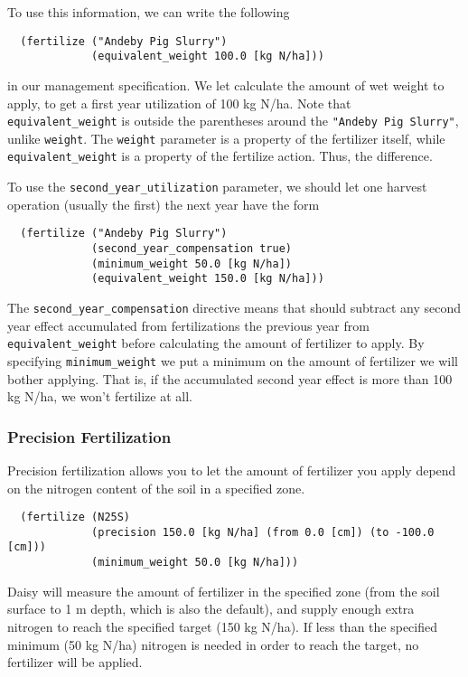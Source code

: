 \documentclass[a4paper,11pt]{article}
\begin{document}
To use this information, we can write the following
\begin{verbatim}
  (fertilize ("Andeby Pig Slurry")
             (equivalent_weight 100.0 [kg N/ha]))
\end{verbatim}
in our management specification.  We let \daisy{} calculate the amount
of wet weight to apply, to get a first year utilization of 100 kg
N/ha.  Note that \texttt{equivalent\_weight} is outside the
parentheses around the \texttt{"Andeby Pig Slurry"}, unlike
\texttt{weight}.  The \texttt{weight} parameter is a property of the
fertilizer itself, while \texttt{equivalent\_weight} is a property of
the fertilize action.  Thus, the difference.

To use the \texttt{second\_year\_utilization} parameter, we should let
one harvest operation (usually the first) the next year have the form
\begin{verbatim}
  (fertilize ("Andeby Pig Slurry")
             (second_year_compensation true)
             (minimum_weight 50.0 [kg N/ha])
             (equivalent_weight 150.0 [kg N/ha]))
\end{verbatim}
The \texttt{second\_year\_compensation} directive means that \daisy{}
should subtract any second year effect accumulated from fertilizations
the previous year from \texttt{equivalent\_weight} before calculating
the amount of fertilizer to apply.  By specifying
\texttt{minimum\_weight} we put a minimum on the amount of fertilizer
we will bother applying.  That is, if the accumulated second year
effect is more than 100 kg N/ha, we won't fertilize at all.

\subsubsection{Precision Fertilization}

Precision fertilization allows you to let the amount of fertilizer you
apply depend on the nitrogen content of the soil in a specified zone.

\begin{verbatim}
  (fertilize (N25S)
             (precision 150.0 [kg N/ha] (from 0.0 [cm]) (to -100.0 [cm]))
             (minimum_weight 50.0 [kg N/ha]))
\end{verbatim}

Daisy will measure the amount of fertilizer in the specified zone (from
the soil surface to 1 m depth, which is also the default), and supply
enough extra nitrogen to reach the specified target (150 kg N/ha).  If
less than the specified minimum (50 kg N/ha) nitrogen is needed in
order to reach the target, no fertilizer will be applied.
\end{document}

